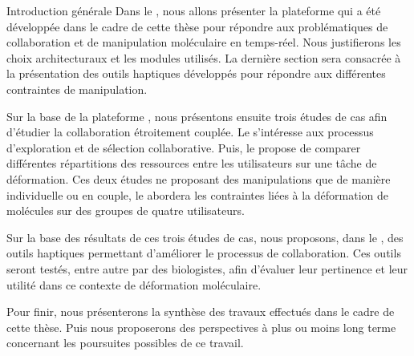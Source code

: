 \documentclass[myfrancais,ngerman,english,french]{mythesis}
\begin{document}
\begin{mychapter+}{Introduction générale}
		Dans le , nous allons présenter la plateforme \myShaddock qui a été développée dans le cadre de cette thèse pour répondre aux problématiques de collaboration et de manipulation moléculaire en temps-réel.
		Nous justifierons les choix architecturaux et les modules utilisés.
		La dernière section sera consacrée à la présentation des outils haptiques développés pour répondre aux différentes contraintes de manipulation.

		Sur la base de la plateforme \myShaddock, nous présentons ensuite trois études de cas afin d'étudier la collaboration étroitement couplée.
		Le  s'intéresse aux processus d'exploration et de sélection collaborative.
		Puis, le  propose de comparer différentes répartitions des ressources entre les utilisateurs sur une tâche de déformation.
		Ces deux études ne proposant des manipulations que de manière individuelle ou en couple, le  abordera les contraintes liées à la déformation de molécules sur des groupes de quatre utilisateurs.

		Sur la base des résultats de ces trois études de cas, nous proposons, dans le , des outils haptiques permettant d'améliorer le processus de collaboration.
		Ces outils seront testés, entre autre par des biologistes, afin d'évaluer leur pertinence et leur utilité dans ce contexte de déformation moléculaire.

		Pour finir, nous présenterons la synthèse des travaux effectués dans le cadre de cette thèse.
		Puis nous proposerons des perspectives à plus ou moins long terme concernant les poursuites possibles de ce travail.
	\end{mychapter+}
\end{document}
